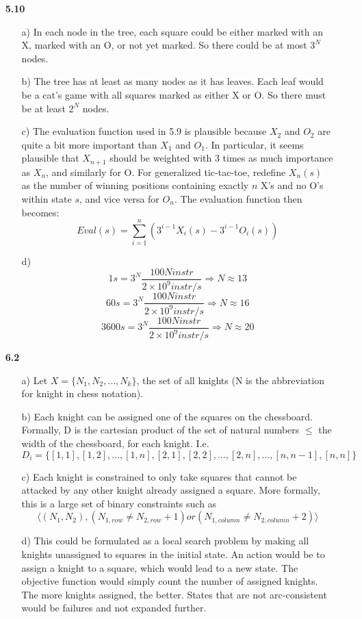 \documentclass{article}
\begin{document}
\begin{enumerate}
\item[\textbf{5.10}]
\begin{enumerate}
\item[a)]
In each node in the tree, each square could be either marked with an X, marked
with an O, or not yet marked. So there could be at most $3^N$ nodes.
\item[b)]
The tree has at least as many nodes as it has leaves. Each leaf would be a
cat's game with all squares marked as either X or O. So there must be at least
$2^N$ nodes.
\item[c)]
The evaluation function used in 5.9 is plausible because $X_2$ and $O_2$ are
quite a bit more important than $X_1$ and $O_1$. In particular, it seems
plausible that $X_{n+1}$ should be weighted with 3 times as much importance as
$X_n$, and similarly for O. For generalized tic-tac-toe, redefine $X_n(s)$ as
the number of winning positions containing exactly $n$ X's and no O's within
state $s$, and vice versa for $O_n$. The evaluation function then becomes:
\[
Eval(s) = \sum_{i=1}^n (3^{i-1}X_i(s) - 3^{i-1}O_i(s))
\]
\item[d)]
\[
1s = 3^N \frac{100N instr}{2 \times 10^9 instr/s} \Longrightarrow N \approx 13
\]
\[
60s = 3^N \frac{100N instr}{2 \times 10^9 instr/s} \Longrightarrow N \approx 16
\]
\[
3600s = 3^N \frac{100N instr}{2 \times 10^9 instr/s} \Longrightarrow N \approx 20
\]

\end{enumerate}

\item[\textbf{6.2}]
\begin{enumerate}
\item[a)]
Let $X = \{N_1,N_2, \ldots ,N_k\}$, the set of all knights (N is the
abbreviation for knight in chess notation).
\item[b)]
Each knight can be assigned one of the squares on the chessboard. Formally, D
is the cartesian product of the set of natural numbers $\le$ the width of
the chessboard, for each knight. I.e.
\[
D_i = \{[1,1],[1,2], \ldots ,[1,n],[2,1],
[2,2], \ldots ,[2,n], \ldots ,[n,n-1],[n,n]\}
\]
\item[c)]
Each knight is constrained to only take squares that cannot be attacked by any
other knight already assigned a square. More formally, this is a large set of
binary constraints such as
\[
\langle (N_1,N_2), (N_{1,row} \ne N_{2,row} + 1) or
(N_{1,column} \ne N_{2,column} + 2) \rangle
\]
\item[d)]
This could be formulated as a local search problem by making all knights
unassigned to squares in the initial state. An action would be to assign a
knight to a square, which would lead to a new state. The objective function
would simply count the number of assigned knights. The more knights assigned,
the better. States that are not arc-consistent would be failures and not
expanded further.
\end{enumerate}


\end{enumerate}
\end{document}
